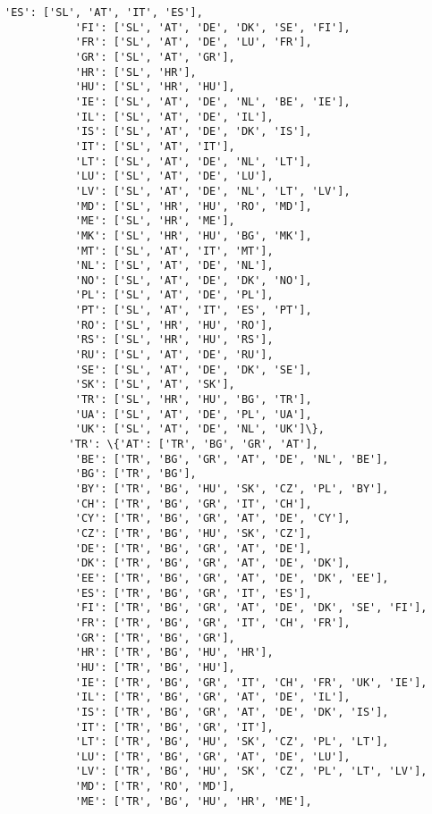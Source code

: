 \documentclass[11pt]{article}
\begin{document}
\begin{Verbatim}[commandchars=\\\{\}]
           'ES': ['SL', 'AT', 'IT', 'ES'],
           'FI': ['SL', 'AT', 'DE', 'DK', 'SE', 'FI'],
           'FR': ['SL', 'AT', 'DE', 'LU', 'FR'],
           'GR': ['SL', 'AT', 'GR'],
           'HR': ['SL', 'HR'],
           'HU': ['SL', 'HR', 'HU'],
           'IE': ['SL', 'AT', 'DE', 'NL', 'BE', 'IE'],
           'IL': ['SL', 'AT', 'DE', 'IL'],
           'IS': ['SL', 'AT', 'DE', 'DK', 'IS'],
           'IT': ['SL', 'AT', 'IT'],
           'LT': ['SL', 'AT', 'DE', 'NL', 'LT'],
           'LU': ['SL', 'AT', 'DE', 'LU'],
           'LV': ['SL', 'AT', 'DE', 'NL', 'LT', 'LV'],
           'MD': ['SL', 'HR', 'HU', 'RO', 'MD'],
           'ME': ['SL', 'HR', 'ME'],
           'MK': ['SL', 'HR', 'HU', 'BG', 'MK'],
           'MT': ['SL', 'AT', 'IT', 'MT'],
           'NL': ['SL', 'AT', 'DE', 'NL'],
           'NO': ['SL', 'AT', 'DE', 'DK', 'NO'],
           'PL': ['SL', 'AT', 'DE', 'PL'],
           'PT': ['SL', 'AT', 'IT', 'ES', 'PT'],
           'RO': ['SL', 'HR', 'HU', 'RO'],
           'RS': ['SL', 'HR', 'HU', 'RS'],
           'RU': ['SL', 'AT', 'DE', 'RU'],
           'SE': ['SL', 'AT', 'DE', 'DK', 'SE'],
           'SK': ['SL', 'AT', 'SK'],
           'TR': ['SL', 'HR', 'HU', 'BG', 'TR'],
           'UA': ['SL', 'AT', 'DE', 'PL', 'UA'],
           'UK': ['SL', 'AT', 'DE', 'NL', 'UK']\},
          'TR': \{'AT': ['TR', 'BG', 'GR', 'AT'],
           'BE': ['TR', 'BG', 'GR', 'AT', 'DE', 'NL', 'BE'],
           'BG': ['TR', 'BG'],
           'BY': ['TR', 'BG', 'HU', 'SK', 'CZ', 'PL', 'BY'],
           'CH': ['TR', 'BG', 'GR', 'IT', 'CH'],
           'CY': ['TR', 'BG', 'GR', 'AT', 'DE', 'CY'],
           'CZ': ['TR', 'BG', 'HU', 'SK', 'CZ'],
           'DE': ['TR', 'BG', 'GR', 'AT', 'DE'],
           'DK': ['TR', 'BG', 'GR', 'AT', 'DE', 'DK'],
           'EE': ['TR', 'BG', 'GR', 'AT', 'DE', 'DK', 'EE'],
           'ES': ['TR', 'BG', 'GR', 'IT', 'ES'],
           'FI': ['TR', 'BG', 'GR', 'AT', 'DE', 'DK', 'SE', 'FI'],
           'FR': ['TR', 'BG', 'GR', 'IT', 'CH', 'FR'],
           'GR': ['TR', 'BG', 'GR'],
           'HR': ['TR', 'BG', 'HU', 'HR'],
           'HU': ['TR', 'BG', 'HU'],
           'IE': ['TR', 'BG', 'GR', 'IT', 'CH', 'FR', 'UK', 'IE'],
           'IL': ['TR', 'BG', 'GR', 'AT', 'DE', 'IL'],
           'IS': ['TR', 'BG', 'GR', 'AT', 'DE', 'DK', 'IS'],
           'IT': ['TR', 'BG', 'GR', 'IT'],
           'LT': ['TR', 'BG', 'HU', 'SK', 'CZ', 'PL', 'LT'],
           'LU': ['TR', 'BG', 'GR', 'AT', 'DE', 'LU'],
           'LV': ['TR', 'BG', 'HU', 'SK', 'CZ', 'PL', 'LT', 'LV'],
           'MD': ['TR', 'RO', 'MD'],
           'ME': ['TR', 'BG', 'HU', 'HR', 'ME'],

\end{Verbatim}
\end{document}
